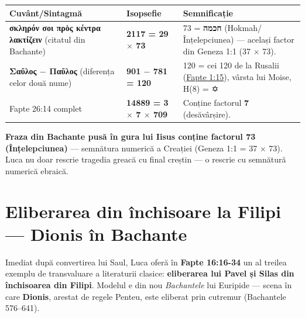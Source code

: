 \documentclass[12pt,a4paper,twoside,openany]{book}
\begin{document}
\begin{center}
\small
\begin{tabular}{L{5cm}C{3cm}L{5cm}}
\toprule
{}
\textbf{Cuvânt/Sintagmă} & \textbf{Isopsefie} & \textbf{Semnificație} \\
\midrule
\textbf{σκληρόν σοι πρὸς κέντρα λακτίζειν} (citatul din Bachante) & \textbf{\textcolor{primary}{2117 = 29 $\times$ 73}} & 73 = \textbf{חכמה} (Hokmah/Înțelepciunea) --- același factor din Geneza 1:1 (37 $\times$ 73). \\
\textbf{Σαῦλος $-$ Παῦλος} (diferența celor două nume) & \textbf{\textcolor{primary}{901 $-$ 781 = 120}} & 120 = cei 120 de la Rusalii (\href{https://bibliaortodoxa.ro/carte.php?id=26\&cap=1\#15}{Fapte 1:15}), vârsta lui Moise, H(8) = ✡ \\
Fapte 26:14 complet & \textbf{\textcolor{primary}{14889 = 3 $\times$ 7 $\times$ 709}} & Conține factorul \textbf{7} (desăvârșire). \\
\bottomrule
\end{tabular}
\end{center}
\normalsize

\textbf{\textcolor{primary}{Fraza din Bachante pusă în gura lui Iisus conține factorul 73 (Înțelepciunea)}} --- semnătura numerică a Creației (Geneza 1:1 = 37 $\times$ 73). Luca nu doar rescrie tragedia greacă cu final creștin --- o rescrie cu semnătură numerică ebraică.


\section{Eliberarea din închisoare la Filipi --- Dionis în Bachante}

Imediat după convertirea lui Saul, Luca oferă în \textbf{Fapte 16:16-34} un al treilea exemplu de transvaluare a literaturii clasice: \textbf{eliberarea lui Pavel și Silas din închisoarea din Filipi}. Modelul e din nou \textit{Bachantele} lui Euripide --- scena în care \textbf{Dionis}, arestat de regele Penteu, este eliberat prin cutremur (Bachantele 576--641).
\end{document}
